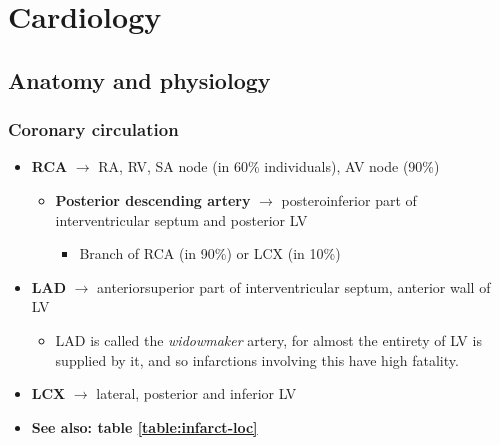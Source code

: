 \documentclass[
  12pt,
]{memoir}
\providecommand{\tightlist}{%
  \setlength{\itemsep}{0pt}\setlength{\parskip}{0pt}}
\begin{document}
\pagebreak

\hypertarget{cardiology}{%
\chapter{Cardiology}\label{cardiology}}

\hypertarget{anatomy-and-physiology}{%
\section{Anatomy and physiology}\label{anatomy-and-physiology}}

\hypertarget{coronary-circulation}{%
\subsection{Coronary circulation}\label{coronary-circulation}}

\label{ssec:coronary}

\begin{itemize}
\tightlist
\item
  \textbf{RCA} \(\rightarrow\) RA, RV, SA node (in 60\% individuals), AV
  node (90\%)

  \begin{itemize}
  \tightlist
  \item
    \textbf{Posterior descending artery} \(\rightarrow\) posteroinferior
    part of interventricular septum and posterior LV

    \begin{itemize}
    \tightlist
    \item
      Branch of RCA (in 90\%) or LCX (in 10\%)
    \end{itemize}
  \end{itemize}
\item
  \textbf{LAD} \(\rightarrow\) anteriorsuperior part of interventricular
  septum, anterior wall of LV

  \begin{itemize}
  \tightlist
  \item
    LAD is called the \emph{widowmaker} artery, for almost the entirety
    of LV is supplied by it, and so infarctions involving this have high
    fatality.
  \end{itemize}
\item
  \textbf{LCX} \(\rightarrow\) lateral, posterior and inferior LV
\item
  \textbf{See also: table \ref{table:infarct-loc}}
\end{itemize}
\end{document}
